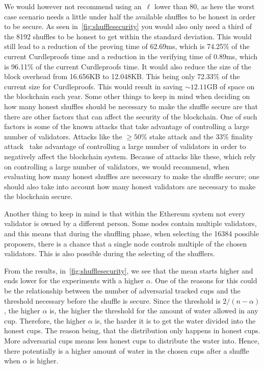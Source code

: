 We would however not recommend using an~$\ell$ lower than 80, as here the worst case scenario needs a little under half the available shuffles to be honest in order to be secure.
As seen in~\autoref{fig:shufflesecurity} you would also only need a third of the 8192 shuffles to be honest to get within the standard deviation.
This would still lead to a reduction of the proving time of 62.69ms, which is 74.25\% of the current Curdleproofs time and a reduction in the verifying time of 0.89ms, which is 96.11\% of the current Curdleproofs time.
It would also reduce the size of the block overhead from 16.656KB to 12.048KB.
This being only 72.33\% of the current size for Curdleproofs.
This would result in saving $\sim 12.11$GB of space on the blockchain each year.
Some other things to keep in mind when deciding on how many honest shuffles should be necessary to make the shuffle secure are that there are other factors that can affect the security of the blockchain.
One of such factors is some of the known attacks that take advantage of controlling a large number of validators.
Attacks like the $\geq50\%$ stake attack and the $33\%$ finality attack~\cite{EthereumAttackDefense2024} take advantage of controlling a large number of validators in order to negatively affect the blockchain system.
Because of attacks like these, which rely on controlling a large number of validators, we would recommend, when evaluating how many honest shuffles are necessary to make the shuffle secure; one should also take into account how many honest validators are necessary to make the blockchain secure.

Another thing to keep in mind is that within the Ethereum system not every validator is owned by a different person.
Some nodes contain multiple validators, and this means that during the shuffling phase, when selecting the 16384 possible proposers, there is a chance that a single node controls multiple of the chosen validators.
This is also possible during the selecting of the shufflers.

From the results, in~\autoref{fig:shufflesecurity}, we see that the mean starts higher and ends lower for the experiments with a higher $\alpha$.
One of the reasons for this could be the relationship between the number of adversarial tracked cups and the threshold necessary before the shuffle is secure.
Since the threshold is $2/(n-\alpha)$, the higher $\alpha$ is, the higher the threshold for the amount of water allowed in any cup.
Therefore, the higher $\alpha$ is, the harder it is to get the water divided into the honest cups.
The reason being, that the distribution only happens in honest cups. 
More adversarial cups means less honest cups to distribute the water into.
Hence, there potentially is a higher amount of water in the chosen cups after a shuffle when $\alpha$ is higher. 
